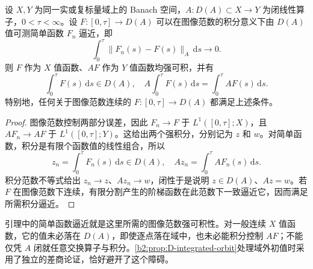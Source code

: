 \begin{lemma}[闭算子与图像范数积分]\label{b2:lem:D-graph-integral}
设 \(X,Y\) 为同一实或复标量域上的 Banach 空间，\(A:D(A)\subset X\to Y\) 为闭线性算子，\(0<\tau<\infty\)。设 \(F:[0,\tau]\to D(A)\) 可以在图像范数的积分意义下由 \(D(A)\) 值可测简单函数 \(F_n\) 逼近，即
\[
 \int_0^\tau\|F_n(s)-F(s)\|_A\,\mathrm ds\longrightarrow0.
\]
则 \(F\) 作为 \(X\) 值函数、\(AF\) 作为 \(Y\) 值函数均强可积，并有
\begin{equation}\label{b2:eq:D-graph-integral}
 \int_0^\tau F(s)\,\mathrm ds\in D(A),\quad
 A\int_0^\tau F(s)\,\mathrm ds
 =\int_0^\tau AF(s)\,\mathrm ds.
\end{equation}
特别地，任何关于图像范数连续的 \(F:[0,\tau]\to D(A)\) 都满足上述条件。
\end{lemma}
\begin{proof}
图像范数控制两部分误差，因此 \(F_n\to F\) 于 \(L^1([0,\tau];X)\)，且 \(AF_n\to AF\) 于 \(L^1([0,\tau];Y)\)。这给出两个强积分，分别记为 \(z\) 和 \(w\)。对简单函数，积分是有限个函数值的线性组合，所以
\[
 z_n=\int_0^\tau F_n(s)\,\mathrm ds\in D(A),\quad
 Az_n=\int_0^\tau AF_n(s)\,\mathrm ds.
\]
积分范数不等式给出 \(z_n\to z\)、\(Az_n\to w\)，闭性于是说明 \(z\in D(A)\)、\(Az=w\)。若 \(F\) 在图像范数下连续，有限分割产生的阶梯函数在此范数下一致逼近它，因而满足所需积分逼近。
\end{proof}
引理中的简单函数逼近就是这里所需的图像范数强可积性。对一般连续 \(X\) 值函数，它的值未必落在 \(D(A)\)，即使逐点落在域中，也未必能积分控制 \(AF\)；不能仅凭 \(A\) 闭就任意交换算子与积分。\cref{b2:prop:D-integrated-orbit}处理域外初值时采用了独立的差商论证，恰好避开了这个障碍。

